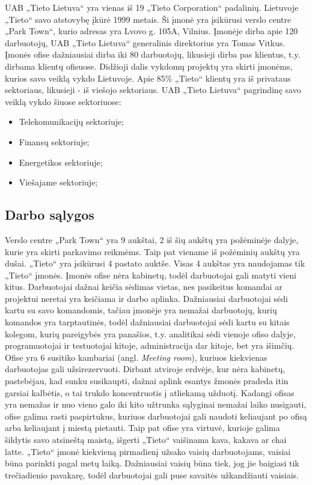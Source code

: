 \documentclass{VUMIFPSbakalaurinis}
\begin{document}
UAB „Tieto Lietuva“ yra vienas iš 19 „Tieto Corporation“ padalinių. Lietuvoje „Tieto“ savo atstovybę įkūrė 1999 metais. Ši įmonė yra įsikūrusi verslo centre „Park Town“, kurio adresas yra Lvovo g. 105A, Vilnius. Įmonėje dirba apie 120 darbuotojų, UAB „Tieto Lietuva“ generalinis direktorius yra Tomas Vitkus. Įmonės ofise dažniausiai dirba iki 80 darbuotojų, likusieji dirba pas klientus, t.y. dirbama klientų ofisuose. Didžioji dalis vykdomų projektų yra skirti įmonėms, kurios savo veiklą vykdo Lietuvoje. Apie 85\% „Tieto“ klientų yra iš privataus sektoriaus, likusieji - iš viešojo sektoriaus. UAB „Tieto Lietuva“ pagrindinę savo veiklą vykdo šiuose sektoriuose: 

\begin{itemize}
    \item Telekomunikacijų sektoriuje;
    \item Finansų sektoriuje;
    \item Energetikos sektoriuje;
    \item Viešajame sektoriuje;
\end{itemize}

\subsection{Darbo sąlygos}
Verslo centre „Park Town“ yra 9 aukštai, 2 iš šių aukštų yra požėminėje dalyje, kurie yra skirti parkavimo reikmėms. Taip pat viename iš požėminių aukštų yra dušai. „Tieto“ yra įsikūrusi 4 pastato auktše. Visas 4 aukštas yra naudojamas tik „Tieto“ įmonės. Įmonės ofise nėra kabinetų, todėl darbuotojai gali matyti vieni kitus. Darbuotojai dažnai keičia sėdimas vietas, nes pasikeitus komandai ar projektui neretai yra keičiama ir darbo aplinka. Dažniausiai darbuotojai sėdi kartu su savo komandomis, tačiau įmonėje yra nemažai darbuotojų, kurių komandos yra tarptautinės, todėl dažniausiai darbuotojai sėdi kartu su kitais kolegom, kurių pareigybės yra panašios, t.y. analitikai sėdi vienoje ofiso dalyje, programuotojai ir testuotojai kitoje, administracija dar kitoje, bet yra išimčių. Ofise yra 6 susitiko kambariai (angl. \textit{Meeting room}), kuriuos kiekvienas darbuotojas gali užsirezervuoti. Dirbant atviroje erdvėje, kur nėra kabinetų, pastebėjau, kad sunku susikaupti, dažnai aplink esantys žmonės pradeda itin garsiai kalbėtis, o tai trukdo koncentruotis į atliekamą užduotį. Kadangi ofisas yra nemažas ir nuo vieno galo iki kito užtrunka sąlyginai nemažai laiko nusigauti, ofise galima rasti paspirtukus, kuriuos darbuotojai gali naudoti keliaujant po ofisą arba keliaujant į miestą pietauti. Taip pat ofise yra virtuvė, kurioje galima šildytis savo atsineštą maistą, išgerti „Tieto“ vaišinama kava, kakava ar chai latte. „Tieto“ įmonė kiekvieną pirmadienį užsako vaisių darbuotojams, vaisiai būna parinkti pagal metų laiką. Dažniausiai vaisių būna tiek, jog jie baigiasi tik trečiadienio pavakarę, todėl darbuotojai gali puse savaitės užkandžiauti vaisiais.
\end{document}
